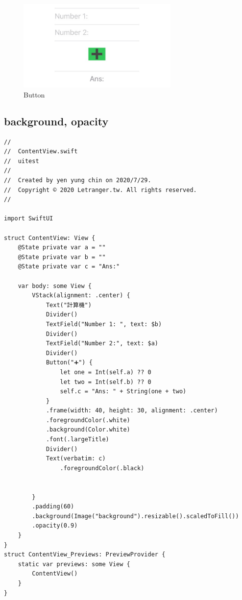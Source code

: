 \documentclass[a4paper,12pt]{article}
\begin{document}
\begin{figure}[htbp]
\centering
\includegraphics[width=300]{images/btn-1.jpg}
\caption{\label{fig:Button-1}Button}
\end{figure}

\subsection{background, opacity}
\label{sec:org1be7984}
\lstset{breaklines=true,language=swift,label= ,caption= ,captionpos=b,firstnumber=1,numbers=left}
\begin{lstlisting}
//
//  ContentView.swift
//  uitest
//
//  Created by yen yung chin on 2020/7/29.
//  Copyright © 2020 Letranger.tw. All rights reserved.
//

import SwiftUI

struct ContentView: View {
    @State private var a = ""
    @State private var b = ""
    @State private var c = "Ans:"

    var body: some View {
        VStack(alignment: .center) {
            Text("計算機")
            Divider()
            TextField("Number 1: ", text: $b)
            Divider()
            TextField("Number 2:", text: $a)
            Divider()
            Button("➕") {
                let one = Int(self.a) ?? 0
                let two = Int(self.b) ?? 0
                self.c = "Ans: " + String(one + two)
            }
            .frame(width: 40, height: 30, alignment: .center)
            .foregroundColor(.white)
            .background(Color.white)
            .font(.largeTitle)
            Divider()
            Text(verbatim: c)
                .foregroundColor(.black)


        }
        .padding(60)
        .background(Image("background").resizable().scaledToFill())
        .opacity(0.9)
    }
}
struct ContentView_Previews: PreviewProvider {
    static var previews: some View {
        ContentView()
    }
}


\end{lstlisting}
\end{document}

